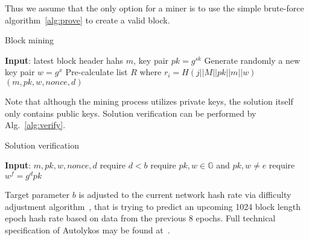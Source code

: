 Thus we assume that the only option for a miner is to use the simple brute-force algorithm~\ref{alg:prove} to
create a valid block.

\begin{algorithm}[H]
    \caption{Block mining}
    \label{alg:prove}
    \begin{algorithmic}[1]
        \State \textbf{Input}: latest block header hahs $m$, key pair $pk=g^{sk}$
        \State Generate randomly a new key pair $w=g^x$
        \State Pre-calculate list $R$ where $r_i=H(j||M||pk||m||w)$
        \State \Return $(m,pk,w,nonce,d)$
        \EndIf
        \EndWhile
    \end{algorithmic}
\end{algorithm}

Note that although the mining process utilizes private keys, the solution itself
only contains public keys. Solution verification can be performed by Alg.~\ref{alg:verify}.

\begin{algorithm}[H]
    \caption{Solution verification}
    \label{alg:verify}
    \begin{algorithmic}[1]
        \State \textbf{Input}: $m,pk,w,nonce,d$
        \State require $d < b$
        \State require $pk,w\in \mathbb{G}$ and $pk,w \ne e$
        \State require $w^f = g^dpk$
    \end{algorithmic}
\end{algorithm}

Target parameter $b$ is adjusted to the current network hash rate via difficulty adjustment
algorithm~\cite{meshkov2017short}, that is trying to predict an upcoming 1024 block length
epoch hash rate based on data from the previous 8 epochs.
Full technical specification of Autolykos may be found at~\cite{Ergopow}.